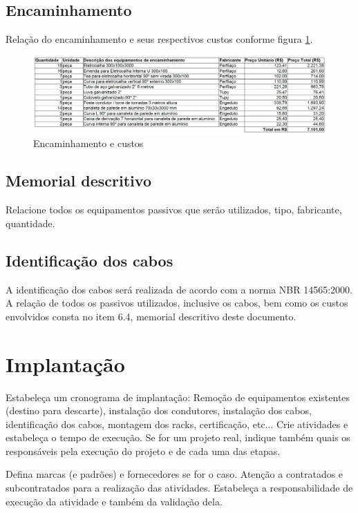 \documentclass[	DIV=calc,%
							paper=a4,%
							fontsize=12pt,%
							onecolumn]{scrartcl}	 					%
\begin{document}


\subsection{Encaminhamento}
Relação do encaminhamento e seus respectivos custos conforme figura \ref{figura4}.  
\begin{figure}
	\centering
	\includegraphics[width=\textwidth]{figura4}
	\caption{Encaminhamento e custos}
	\label{figura4}
\end{figure}

\subsection{Memorial descritivo}

Relacione todos os equipamentos passivos que serão utilizados, tipo, fabricante, quantidade.

\subsection{Identificação dos cabos}
A identificação dos cabos será realizada de acordo com a norma NBR 14565:2000. A relação de todos os passivos utilizados, inclusive os cabos, bem como os custos envolvidos consta no item 6.4, memorial descritivo deste documento. 

\section{Implantação}
Estabeleça um cronograma de implantação:
Remoção de equipamentos existentes (destino para descarte), instalação dos condutores, instalação dos cabos, 
identificação dos cabos, montagem dos racks, certificação, etc... Crie atividades e estabeleça o tempo de execução. Se for um projeto real, indique também quais os responsáveis pela execução do projeto e de cada uma das etapas.

Defina marcas (e padrões) e fornecedores se for o caso. Atenção a contratados e subcontratados para a realização das atividades. Estabeleça a responsabilidade de execução da atividade e também da validação dela.
\end{document}
